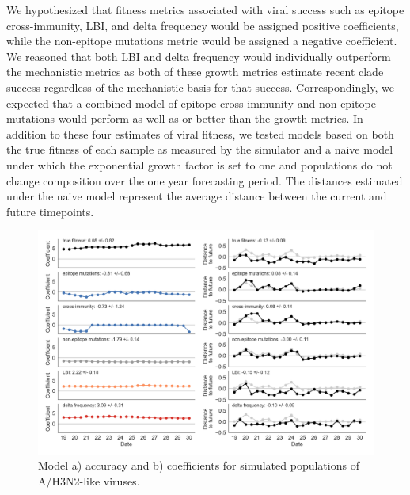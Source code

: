 We hypothesized that fitness metrics associated with viral success such as epitope cross-immunity, LBI, and delta frequency would be assigned positive coefficients, while the non-epitope mutations metric would be assigned a negative coefficient.
We reasoned that both LBI and delta frequency would individually outperform the mechanistic metrics as both of these growth metrics estimate recent clade success regardless of the mechanistic basis for that success.
Correspondingly, we expected that a combined model of epitope cross-immunity and non-epitope mutations would perform as well as or better than the growth metrics.
In addition to these four estimates of viral fitness, we tested models based on both the true fitness of each sample as measured by the simulator and a naive model under which the exponential growth factor is set to one and populations do not change composition over the one year forecasting period.
The distances estimated under the naive model represent the average distance between the current and future timepoints.

\begin{figure}[t]
  \begin{center}
  \includegraphics[width=\textwidth]{figures/unadjusted-model-accuracy-and-coefficients-for-simulated-populations.png}
  \caption{Model a) accuracy and b) coefficients for simulated populations of A/H3N2-like viruses.}
  \label{fig:unadjusted_model_accuracy_and_coefficients_for_simulated_populations}
  \end{center}
\end{figure}

